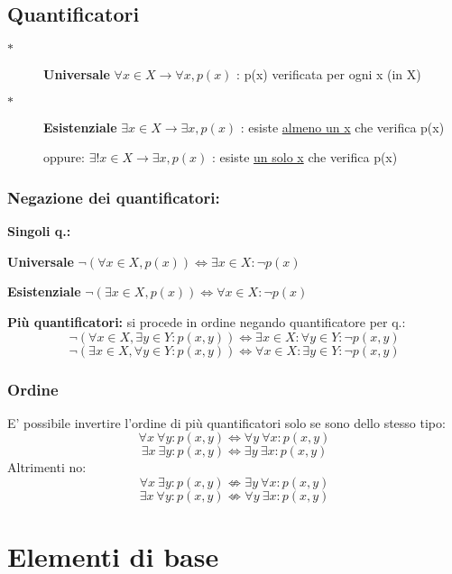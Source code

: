 \documentclass[10pt]{article}
\theoremstyle{plain}
\begin{document}
\subsection{Quantificatori}
\begin{description}
   \item[$\ast$] \textbf{Universale} $\forall  x \in X \longrightarrow \forall x, p(x)$ : p(x) verificata per ogni x (in X)
   \item[$\ast$] \textbf{Esistenziale} $\exists  x \in X \longrightarrow \exists x, p(x)$ : esiste \underline{almeno un x} che verifica p(x)
    \item[] oppure: $\exists!  x \in X \longrightarrow \exists x, p(x)$ : esiste \underline{un solo x} che verifica p(x)
\end{description}
\subsubsection*{Negazione dei quantificatori:}
\begin{description}
\item \textbf{Singoli q.:}
   \item[$\star$] \textbf{Universale} $\neg (\forall x \in X, p(x)) \Longleftrightarrow \exists x \in X : \neg p(x)$
   \item[$\star$] \textbf{Esistenziale} $\neg (\exists x \in X, p(x)) \Longleftrightarrow \forall x \in X : \neg p(x)$
   \item \textbf{Più quantificatori:} si procede in ordine negando quantificatore per q.:
   \[\neg (\forall x \in X, \exists y \in Y : p(x,y)) \Longleftrightarrow \exists x \in X : \forall y \in Y : \neg p(x,y)\]
    \[\neg (\exists x \in X, \forall y \in Y : p(x,y)) \Longleftrightarrow \forall x \in X : \exists y \in Y : \neg p(x,y)\]
\end{description}
\subsubsection*{Ordine}
E' possibile invertire l'ordine di più quantificatori solo se sono dello stesso tipo:
\[\forall x {\ }\forall y : p(x,y) \Longleftrightarrow \forall y {\ }\forall x : p(x,y)\]
\[\exists x {\ }\exists y : p(x,y) \Longleftrightarrow  \exists y {\ }\exists x : p(x,y)\]
Altrimenti no:
\[\forall x {\ }\exists y : p(x,y) \nLeftrightarrow \exists y {\ }\forall x : p(x,y)\]
\[\exists x {\ }\forall y : p(x,y) \nLeftrightarrow \forall y {\ }\exists x : p(x,y)\]

\section{Elementi di base}
\end{document}

